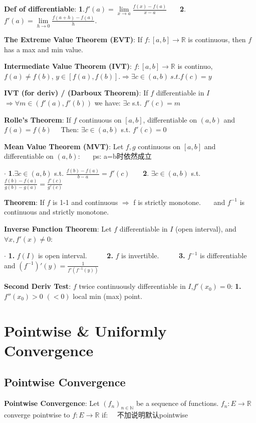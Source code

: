 \documentclass[9pt]{article}
\begin{document}
\textbf{Def of differentiable}: {\scriptsize \textbf{1}.$f'(a)=\lim\limits_{x\to a}\frac{f(x)-f(a)}{x-a}$ \ \ \ \textbf{2}.$f'(a)=\lim\limits_{h\to 0}\frac{f(a+h)-f(a)}{h}$.}

\textbf{The Extreme Value Theorem (EVT)}: If $f:[a,b]\to\mathbb{R}$ is continuous, then $f$ has a max and min value.

\textbf{Intermediate Value Theorem (IVT)}: $f:[a,b]\to\mathbb{R}$ is continuo,$f(a)\ne f(b)$, $y\in[f(a),f(b)]$.$\Rightarrow \exists c\in(a,b) \ s.t. f(c)=y$

\textbf{IVT (for deriv) / (Darboux Theorem)}: If $f$ differentiable in $I$ $\Rightarrow\forall m\in(f'(a),f'(b))$ we have: $\exists c$ s.t. $f'(c)=m$

\textbf{Rolle's Theorem}: If $f$ continuous on $[a,b]$, differentiable on $(a,b)$ and $f(a)=f(b)$ \ \ Then: $\exists c\in(a,b)$ s.t. $f'(c)=0$

\textbf{Mean Value Theorem (MVT)}: Let $f,g$ continuous on $[a,b]$ and differentiable on $(a,b)$: \ \ \ {\scriptsize ps: a=b时依然成立}

$\cdot$ {\small \textbf{1}.$\exists c\in(a,b)$ s.t. $\frac{f(b)-f(a)}{b-a}=f'(c)$ \ \ \ \textbf{2}. $\exists c\in(a,b)$ s.t. $\frac{f(b)-f(a)}{g(b)-g(a)}=\frac{f'(c)}{g'(c)}$}

\textbf{Theorem}: If $f$ is 1-1 and continuous $\Rightarrow$ f is strictly monotone. \ \ \ and $f^{-1}$ is continuous and strictly monotone.

\textbf{Inverse Function Theorem}: Let $f$ differentiable in $I$ (open interval), and $\forall x,f'(x)\ne 0$:

$\cdot$ \textbf{1.} $f(I)$ is open interval. \ \ \ \ \ \textbf{2.} $f$ is invertible. \ \ \ \ \ \textbf{3.} $f^{-1}$ is differentiable and $(f^{-1})'(y)=\frac{1}{f'(f^{-1}(y))}$

\textbf{Second Deriv Test}: $f$ twice continuously differentiable in $I$,$f'(x_0)=0$: \textbf{1.} $f''(x_0)>0$ $(<0)$ local min (max) point.


\section{Pointwise \& Uniformly Convergence}

\subsection{Pointwise Convergence}

\textbf{Pointwise Convergence}: Let $(f_n)_{n\in\mathbb{N}}$ be a sequence of functions. $f_n:E\to\mathbb{R}$ converge pointwise to $f:E\to\mathbb{R}$ if: \ \ {\scriptsize 不加说明默认pointwise}
\end{document}
